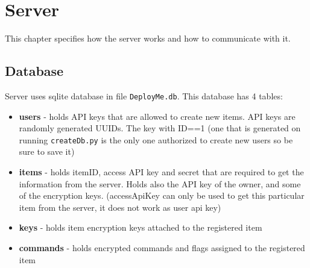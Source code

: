 \chapter{Server}
\label{chapt-Server}
This chapter specifies how the server works and how to communicate with it.

\section{Database}
Server uses sqlite database in file \texttt{DeployMe.db}. This database has 4 tables:
\begin{itemize}
  \item \textbf{users} - holds API keys that are allowed to create new items. API keys are randomly generated UUIDs. The key with ID==1 (one that is generated on running \texttt{createDb.py} is the only one authorized to create new users so be sure to save it)
  \item \textbf{items} - holds itemID, access API key and secret that are required to get the information from the server. Holds also the API key of the owner, and some of the encryption keys. (accessApiKey can only be used to get this particular item from the server, it does not work as user api key)
  \item \textbf{keys} - holds item encryption keys attached to the registered item
  \item \textbf{commands} - holds encrypted commands and flags assigned to the registered item
\end{itemize}